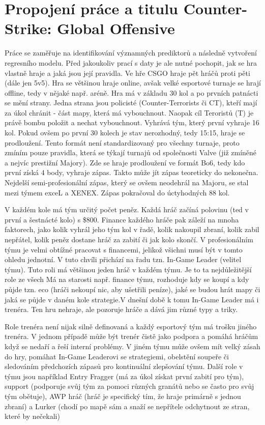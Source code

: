 \newpage
\section{Propojení práce a titulu Counter-Strike: Global Offensive}
Práce se zaměřuje na identifikování významných prediktorů a následně vytvoření regresního modelu. Před jakoukoliv prací s daty je ale nutné pochopit, jak se hra vlastně hraje a
jaká jsou její pravidla. 
Ve hře \ac{CSGO} hraje pět hráčů proti pěti (dále jen 5v5). Hra se většinou hraje online, avšak velké esportové turnaje se hrají offline, tedy v nějaké např. aréně.
Hra má v základu 30 kol a po  prvních patnácti se mění strany. Jedna strana jsou policisté (Counter-Terrorists či CT), kteří mají za úkol chránit  - část mapy,
která má vybouchnout. Naopak cíl Teroristů (T) je právě bombu položit a  nechat vybouchnout. Vyhrává tým, který první vyhraje 16 kol. Pokud ovšem po první 30 kolech
je stav nerozhodný, tedy 15:15, hraje se prodloužení. Tento formát není standardizovaný pro všechny turnaje, proto zmíním pouze pravidla, která se týkají turnajů od společnosti
Valve (již zmíněné a nejvíc prestižní Majory). Zde se hraje prodloužení ve formát Bo6, tedy kdo první získá 4 body, vyhraje zápas. Takto může jít zápas teoreticky
do nekonečna. Nejdelší semi-profesionální zápas, který se ovšem neodehrál na Majoru, se stal mezi týmem exceL a XENEX\cite{hltv.org2015}. Zápas pokračoval do úctyhodných 88 kol.

V každém kole má tým určitý počet peněz. Každá hráč začíná polovinu (ted v první a šestnácté kolo) s \$800. Finance každého hráče pak záleží na mnoha
faktorech, jako
kolik vyhrál jeho tým kol v řadě, kolik nakoupil zbraní, kolik zabil nepřátel, kolik peněz dostane hráč za zabití či jak kolo skončí. V profesionálním týmu je
velmi obtížné pracovat s financemi, jelikož všichni musí být v tomto ohledu jednotní. V tuto chvíli přichází na řadu tzn. In-Game Leader (velitel týmu). Tuto roli má většinou
jeden hráč v každém týmu. Je to ta nejdůležitější role ze všech Má na starosti např. finance týmu, rozhoduje kdy se koupí a kdy půjde tzn. eco (hráči nekoupí nic, aby ušetřili peníze),
jaké se budou hrát mapy či jaká se půjde v daném kole strategie.V dnešní době k tomu In-Game Leader má i trenéra. Ten hru nehraje, ale pozoruje hráče a dává jim
různé typy a triky.

Role trenéra není nijak silně definovaná a každý esportový tým má trošku jiného trenéra. V jednom případě může být trenér čistě jako podpora
a
pomáhá hráčům když se nedaří a
řeší interní problémy. V jiném týmu může ovšem mít velký zásah do hry, pomáhat In-Game Leaderovi se strategiemi, obelstění soupeře či sledováním předchozích zápasů pro
kontinuální zlepšování týmu. Další role v týmu jsou například Entry Fragger (má za úkol získat první zabití pro tým), support (podporuje svůj tým za pomoci různých granátů
nebo se často pro svůj tým obětuje), AWP hráč (hráč je specifický tím, že hraje primárně s jednou zbraní) a Lurker (chodí po mapě sám a snaží se
nepřítele odchytnout ze stran, které by nečekali)

